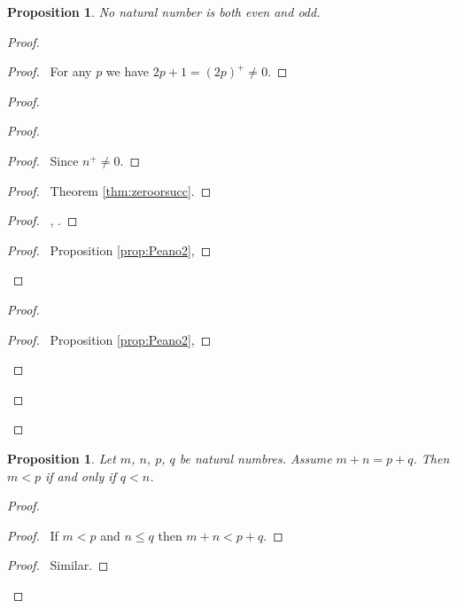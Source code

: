\documentclass{book}
\let\qed\relax
\newtheorem{prop}[ax]{Proposition}
\theoremstyle{definition}
\begin{document}
\begin{prop}
No natural number is both even and odd.
\end{prop}

\begin{proof}
\pf
{}
\begin{proof}
	\pf\ For any $p$ we have $2p+1 = (2p)^+ \neq 0$.
\end{proof}
\begin{proof}
	\begin{proof}
		\begin{proof}
			\pf\ Since $n^+ \neq 0$.
		\end{proof}
		\begin{proof}
			\pf\ Theorem \ref{thm:zeroorsucc}.
		\end{proof}
		\begin{proof}
			\pf\ , .
		\end{proof}
		\begin{proof}
			\pf\ Proposition \ref{prop:Peano2}, 
		\end{proof}
	\end{proof}
	\begin{proof}
		\begin{proof}
			\pf\ Proposition \ref{prop:Peano2}, 
		\end{proof}
	\end{proof}
\end{proof}
\qed
\end{proof}

\begin{prop}
\label{prop:intltlemma}
Let $m$, $n$, $p$, $q$ be natural numbres. Assume $m + n = p + q$. Then $m < p$ if and only if $q < n$.
\end{prop}

\begin{proof}
\pf
{}
\begin{proof}
	\pf\ If $m < p$ and $n \leq q$ then $m+n < p + q$.
\end{proof}
\begin{proof}
	\pf\ Similar.
\end{proof}
\qed
\end{proof}
\end{document}
